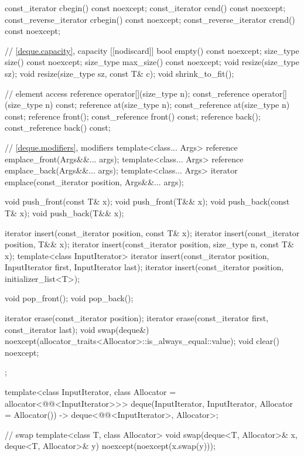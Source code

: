\begin{codeblock}
{{    const_iterator         cbegin() const noexcept;
    const_iterator         cend() const noexcept;
    const_reverse_iterator crbegin() const noexcept;
    const_reverse_iterator crend() const noexcept;

    // \ref{deque.capacity}, capacity
    [[nodiscard]] bool empty() const noexcept;
    size_type size() const noexcept;
    size_type max_size() const noexcept;
    void      resize(size_type sz);
    void      resize(size_type sz, const T& c);
    void      shrink_to_fit();

    // element access
    reference       operator[](size_type n);
    const_reference operator[](size_type n) const;
    reference       at(size_type n);
    const_reference at(size_type n) const;
    reference       front();
    const_reference front() const;
    reference       back();
    const_reference back() const;

    // \ref{deque.modifiers}, modifiers
    template<class... Args> reference emplace_front(Args&&... args);
    template<class... Args> reference emplace_back(Args&&... args);
    template<class... Args> iterator emplace(const_iterator position, Args&&... args);

    void push_front(const T& x);
    void push_front(T&& x);
    void push_back(const T& x);
    void push_back(T&& x);

    iterator insert(const_iterator position, const T& x);
    iterator insert(const_iterator position, T&& x);
    iterator insert(const_iterator position, size_type n, const T& x);
    template<class InputIterator>
      iterator insert(const_iterator position, InputIterator first, InputIterator last);
    iterator insert(const_iterator position, initializer_list<T>);

    void pop_front();
    void pop_back();

    iterator erase(const_iterator position);
    iterator erase(const_iterator first, const_iterator last);
    void     swap(deque&)
      noexcept(allocator_traits<Allocator>::is_always_equal::value);
    void     clear() noexcept;
  };

  template<class InputIterator, class Allocator = allocator<@@<InputIterator>>>
    deque(InputIterator, InputIterator, Allocator = Allocator())
      -> deque<@@<InputIterator>, Allocator>;

  // swap
  template<class T, class Allocator>
    void swap(deque<T, Allocator>& x, deque<T, Allocator>& y)
      noexcept(noexcept(x.swap(y)));
}
\end{codeblock}

